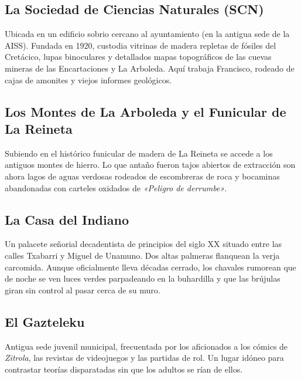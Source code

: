 \subsection{La Sociedad de Ciencias Naturales (SCN)}
Ubicada en un edificio sobrio cercano al ayuntamiento (en la antigua sede de la AISS). Fundada en 1920, custodia vitrinas de madera repletas de fósiles del Cretácico, lupas binoculares y detallados mapas topográficos de las cuevas mineras de las Encartaciones y La Arboleda. Aquí trabaja Francisco, rodeado de cajas de amonites y viejos informes geológicos.

\subsection{Los Montes de La Arboleda y el Funicular de La Reineta}
Subiendo en el histórico funicular de madera de La Reineta se accede a los antiguos montes de hierro. Lo que antaño fueron tajos abiertos de extracción son ahora lagos de aguas verdosas rodeados de escombreras de roca y bocaminas abandonadas con carteles oxidados de \emph{«Peligro de derrumbe»}.

\subsection{La Casa del Indiano}
Un palacete señorial decadentista de principios del siglo XX situado entre las calles Txabarri y Miguel de Unamuno. Dos altas palmeras flanquean la verja carcomida. Aunque oficialmente lleva décadas cerrado, los chavales rumorean que de noche se ven luces verdes parpadeando en la buhardilla y que las brújulas giran sin control al pasar cerca de su muro.

\subsection{El Gazteleku}
Antigua sede juvenil municipal, frecuentada por los aficionados a los cómics de \emph{Zitrola}, las revistas de videojuegos y las partidas de rol. Un lugar idóneo para contrastar teorías disparatadas sin que los adultos se rían de ellos.
